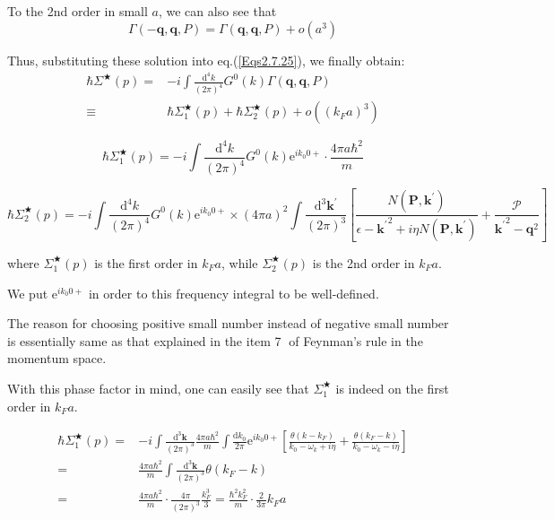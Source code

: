 To the 2nd order in small $a$, we can also see that
\begin{equation*} \label{Eqs2.7.26'} \tag{2.7.26'}
\Gamma(-\mathbf{q},\mathbf{q},P)=\Gamma(\mathbf{q},\mathbf{q},P) + o(a^3)
\end{equation*}

Thus, substituting these solution into eq.(\ref{Eqs2.7.25}), we finally obtain:
\begin{equation} \label{Eqs2.7.27} \begin{split}
\hbar \Sigma^{\bigstar}(p) =& -i \int \frac{\mathrm{d}^4 k}{(2\pi)^4} G^0(k) \Gamma(\mathbf{q},\mathbf{q},P)\\
\equiv& \hbar \Sigma_1^{\bigstar}(p) + \hbar \Sigma_2^{\bigstar}(p) + o((k_F a)^3)
\end{split} \end{equation}

\begin{equation*} \label{Eqs2.7.27'} \tag{2.7.27'}
\hbar \Sigma_1^{\bigstar}(p) = -i \int \frac{\mathrm{d}^4 k}{(2\pi)^4} G^0(k) \mathrm{e}^{i k_0 0 +} \cdot \frac{4\pi a \hbar^2}{m}
\end{equation*}

\begin{equation*} \label{Eqs2.7.27''} \tag{2.7.27''}
\hbar \Sigma_2^{\bigstar}(p) = -i \int \frac{\mathrm{d}^4 k}{(2\pi)^4} G^0(k) \mathrm{e}^{i k_0 0 +} \times (4\pi a)^2 \int \frac{\mathrm{d}^3 \mathbf{k}^{'}}{(2\pi)^3}\left[ \frac{N(\mathbf{P},\mathbf{k}^{'})}{\epsilon-{\mathbf{k}^{'}}^2 + i \eta N(\mathbf{P},\mathbf{k}^{'})} + \frac{\mathscr{P}}{{\mathbf{k}^{'}}^2-\mathbf{q}^2} \right]
\end{equation*}

where $\Sigma_1^{\bigstar}(p)$ is the first order in $k_F a$, while $\Sigma_2^{\bigstar}(p)$ is the 2nd order in $k_F a$.

We put $\mathrm{e}^{i k_0 0+}$ in order to this frequency integral to be well-defined.

The reason for choosing positive small number instead of negative small number is essentially same as that explained in the item \textcircled{7} of Feynman's rule in the momentum space.

With this phase factor in mind, one can easily see that $\Sigma_1^{\bigstar}$ is indeed on the first order in $k_F a$.

\begin{equation} \label{Eqs2.7.28} \begin{split}
\hbar \Sigma_1^{\bigstar}(p) =& -i \int \frac{\mathrm{d}^3 \mathbf{k}}{(2\pi)^3}\frac{4\pi a \hbar^2}{m} \int \frac{\mathrm{d}k_0}{2\pi} \mathrm{e}^{i k_0 0+} \left[ \frac{\theta(k-k_F)}{k_0-\omega_k + i \eta} + \frac{\theta(k_F-k)}{k_0-\omega_k-i \eta} \right]\\
=& \frac{4\pi a \hbar^2}{m} \int \frac{\mathrm{d}^3 \mathbf{k}}{(2\pi)^3} \theta(k_F-k)\\
=&\frac{4\pi a \hbar^2}{m} \cdot \frac{4\pi}{(2\pi)^3} \frac{k_F^3}{3} = \frac{\hbar^2 k_F^2}{m}\cdot\frac{2}{3\pi} k_F a
\end{split} \end{equation}

